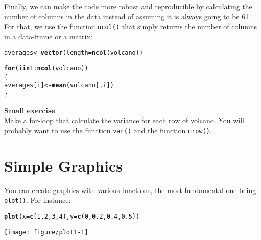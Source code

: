 \documentclass[12pt,a4paper]{scrartcl}\usepackage[]{graphicx}\usepackage[]{color}
\makeatletter
\def\maxwidth{ %
  \ifdim\Gin@nat@width>\linewidth
    \linewidth
  \else
    \Gin@nat@width
  \fi
}
\newcommand{\hlnum}[1]{\textcolor[rgb]{0.686,0.059,0.569}{#1}}%
\newcommand{\hlopt}[1]{\textcolor[rgb]{0,0,0}{#1}}%
\newcommand{\hlstd}[1]{\textcolor[rgb]{0.345,0.345,0.345}{#1}}%
\newcommand{\hlkwa}[1]{\textcolor[rgb]{0.161,0.373,0.58}{\textbf{#1}}}%
\newcommand{\hlkwb}[1]{\textcolor[rgb]{0.69,0.353,0.396}{#1}}%
\newcommand{\hlkwc}[1]{\textcolor[rgb]{0.333,0.667,0.333}{#1}}%
\newcommand{\hlkwd}[1]{\textcolor[rgb]{0.737,0.353,0.396}{\textbf{#1}}}%
\newenvironment{kframe}{%
 \def\at@end@of@kframe{}%
 \ifinner\ifhmode%
  \def\at@end@of@kframe{\end{minipage}}%
  \begin{minipage}{\columnwidth}%
 \fi\fi%
 \def\FrameCommand##1{\hskip\@totalleftmargin \hskip-\fboxsep
 \colorbox{shadecolor}{##1}\hskip-\fboxsep
     \hskip-\linewidth \hskip-\@totalleftmargin \hskip\columnwidth}%
 \MakeFramed {\advance\hsize-\width
   \@totalleftmargin\z@ \linewidth\hsize
   \@setminipage}}%
 {\par\unskip\endMakeFramed%
 \at@end@of@kframe}
\newenvironment{knitrout}{}{} %
\makeatother
\begin{document}
Finally, we can make the code more robust and reproducible by calculating the number of columns in the data instead of assuming it is always going to be 61. For that, we use the function \texttt{ncol()} that simply returns the number of columns in a data-frame or a matrix:

\begin{knitrout}
\color{fgcolor}\begin{kframe}
\begin{alltt}
\hlstd{averages} \hlkwb{<-} \hlkwd{vector}\hlstd{(}\hlkwc{length} \hlstd{=} \hlkwd{ncol}\hlstd{(volcano))}

\hlkwa{for} \hlstd{(i} \hlkwa{in} \hlnum{1}\hlopt{:}\hlkwd{ncol}\hlstd{(volcano))}
\hlstd{\{}
  \hlstd{averages[i]} \hlkwb{<-} \hlkwd{mean}\hlstd{( volcano[,i] )}
\hlstd{\}}
\end{alltt}
\end{kframe}
\end{knitrout}

\begin{mdframed}
\textbf{Small exercise}\\
Make a for-loop that calculate the variance for each row of volcano. You will probably want to use the function \texttt{var()} and the function \texttt{nrow()}.

\end{mdframed}

\section{Simple Graphics}

You can create graphics with various functions, the most fundamental one being \texttt{plot()}.
For instance:

\begin{knitrout}
\color{fgcolor}\begin{kframe}
\begin{alltt}
\hlkwd{plot}\hlstd{(}\hlkwc{x} \hlstd{=} \hlkwd{c}\hlstd{(}\hlnum{1}\hlstd{,}\hlnum{2}\hlstd{,}\hlnum{3}\hlstd{,}\hlnum{4}\hlstd{),} \hlkwc{y}\hlstd{=}\hlkwd{c}\hlstd{(}\hlnum{0}\hlstd{,}\hlnum{0.2}\hlstd{,}\hlnum{0.4}\hlstd{,}\hlnum{0.5}\hlstd{))}
\end{alltt}
\end{kframe}
\texttt{[image: figure/plot1-1]} 

\end{knitrout}
\end{document}
